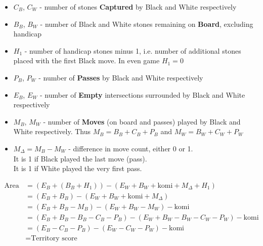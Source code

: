 \documentclass[11pt]{article}
\begin{document}
\begin{itemize}
\item $C_B$, $C_W$ - number of stones \textbf{Captured} by Black and White respectively
\item $B_B$, $B_W$ - number of Black and White stones remaining on \textbf{Board}, excluding handicap
\item $H_1$ - number of handicap stones minus 1, i.e. number of additional stones placed with the first Black move.
In even game $H_1 = 0$
\item $P_B$, $P_W$ - number of \textbf{Passes} by Black and White respectively
\item $E_B$, $E_W$ - number of \textbf{Empty} intersections surrounded by Black and White respectively
\item $M_B$, $M_W$ - number of \textbf{Moves} (on board and passes) played by Black and White respectively.
Thus $M_B = B_B + C_B + P_B$ and $M_W = B_W + C_W + P_W$
\item $M_\Delta = M_B - M_W$ - difference in move count, either 0 or 1. \\
It is 1 if Black played the last move (pass).\\
It is 1 if White played the very first pass.
\end{itemize}

\begin{align}
\text{Area score} &= (E_B + (B_B+H_1)) - (E_W + B_W + \text{komi} + M_\Delta + H_1) \\
&= (E_B + B_B) - (E_W + B_W + \text{komi} + M_\Delta) \\
&= (E_B + B_B - M_B) - (E_W + B_W - M_W) - \text{komi} \\
&= (E_B + B_B - B_B - C_B - P_B ) - (E_W + B_W - B_W - C_W - P_W) - \text{komi} \\
&= (E_B - C_B - P_B) - (E_W - C_W - P_W) - \text{komi} \\
&= \text{Territory score}
\end{align}
\end{document}
